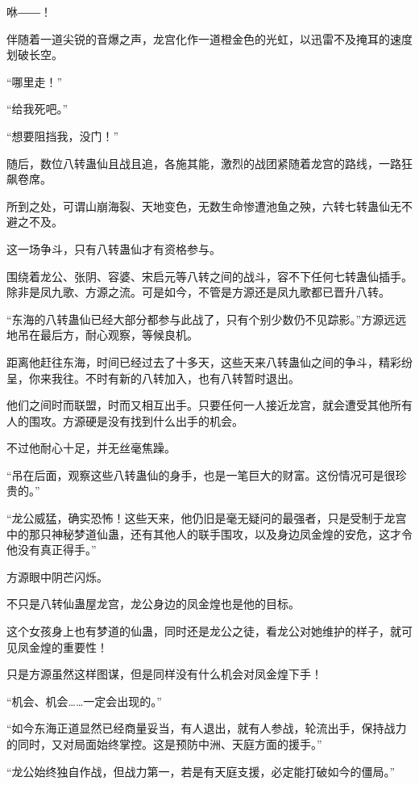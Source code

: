 
\begin{this_body}

咻――！

伴随着一道尖锐的音爆之声，龙宫化作一道橙金色的光虹，以迅雷不及掩耳的速度划破长空。

“哪里走！”

“给我死吧。”

“想要阻挡我，没门！”

随后，数位八转蛊仙且战且追，各施其能，激烈的战团紧随着龙宫的路线，一路狂飙卷席。

所到之处，可谓山崩海裂、天地变色，无数生命惨遭池鱼之殃，六转七转蛊仙无不避之不及。

这一场争斗，只有八转蛊仙才有资格参与。

围绕着龙公、张阴、容婆、宋启元等八转之间的战斗，容不下任何七转蛊仙插手。除非是凤九歌、方源之流。可是如今，不管是方源还是凤九歌都已晋升八转。

“东海的八转蛊仙已经大部分都参与此战了，只有个别少数仍不见踪影。”方源远远地吊在最后方，耐心观察，等候良机。

距离他赶往东海，时间已经过去了十多天，这些天来八转蛊仙之间的争斗，精彩纷呈，你来我往。不时有新的八转加入，也有八转暂时退出。

他们之间时而联盟，时而又相互出手。只要任何一人接近龙宫，就会遭受其他所有人的围攻。方源硬是没有找到什么出手的机会。

不过他耐心十足，并无丝毫焦躁。

“吊在后面，观察这些八转蛊仙的身手，也是一笔巨大的财富。这份情况可是很珍贵的。”

“龙公威猛，确实恐怖！这些天来，他仍旧是毫无疑问的最强者，只是受制于龙宫中的那只神秘梦道仙蛊，还有其他人的联手围攻，以及身边凤金煌的安危，这才令他没有真正得手。”

方源眼中阴芒闪烁。

不只是八转仙蛊屋龙宫，龙公身边的凤金煌也是他的目标。

这个女孩身上也有梦道的仙蛊，同时还是龙公之徒，看龙公对她维护的样子，就可见凤金煌的重要性！

只是方源虽然这样图谋，但是同样没有什么机会对凤金煌下手！

“机会、机会……一定会出现的。”

“如今东海正道显然已经商量妥当，有人退出，就有人参战，轮流出手，保持战力的同时，又对局面始终掌控。这是预防中洲、天庭方面的援手。”

“龙公始终独自作战，但战力第一，若是有天庭支援，必定能打破如今的僵局。”


\end{this_body}
